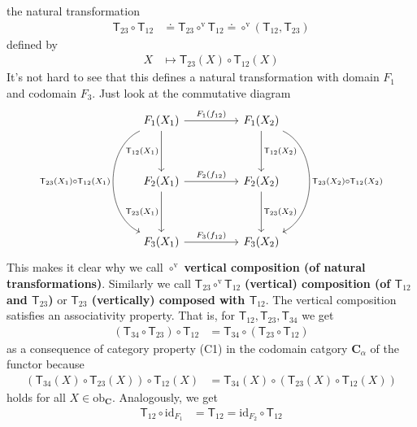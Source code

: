 the natural transformation
\begin{align*}
  \mathsf{T}_{23}
  \circ
  \mathsf{T}_{12}
  &\doteq
  \mathsf{T}_{23}
  \circ^{\textrm{v}}
  \mathsf{T}_{12}
  \doteq
  \circ^{\textrm{v}}(\mathsf{T}_{12},\mathsf{T}_{23})
\end{align*}
defined by
\begin{align*}
  X
  &\mapsto
  \mathsf{T}_{23}(X)
  \circ
  \mathsf{T}_{12}(X)
\end{align*}
It's not hard to see that this defines a natural transformation with domain $F_{1}$ and codomain $F_{3}$. Just look at the commutative diagram
\[
\begin{tikzcd}[sep=huge]
  F_{1}(X_{1})
  \arrow{r}{F_{1}(f_{12})}
  \arrow[swap]{d}{\mathsf{T}_{12}(X_{1})}
  \arrow[bend right=65,swap]{dd}{\mathsf{T}_{23}(X_{1}) \circ \mathsf{T}_{12}(X_{1})}
  &
  F_{1}(X_{2})
  \arrow{d}{\mathsf{T}_{12}(X_{2})}
  \arrow[bend left=65]{dd}{\mathsf{T}_{23}(X_{2}) \circ \mathsf{T}_{12}(X_{2})}
  \\
  F_{2}(X_{1})
  \arrow{r}{F_{2}(f_{12})}
  \arrow[swap]{d}{\mathsf{T}_{23}(X_{1})}
  &
  F_{2}(X_{2})
  \arrow{d}{\mathsf{T}_{23}(X_{2})}
  \\
  F_{3}(X_{1})
  \arrow{r}{F_{3}(f_{12})}
  &
  F_{3}(X_{2})
\end{tikzcd}
\]
This makes it clear why we call $\circ^{\textrm{v}}$ \textbf{vertical composition (of natural transformations)}. Similarly we call $\mathsf{T}_{23} \circ^{\textrm{v}} \mathsf{T}_{12}$ \textbf{(vertical) composition (of $\mathsf{T}_{12}$ and $\mathsf{T}_{23}$)} or \textbf{$\mathsf{T}_{23}$ (vertically) composed with $\mathsf{T}_{12}$}. The vertical composition satisfies an associativity property. That is, for $\mathsf{T}_{12},\mathsf{T}_{23},\mathsf{T}_{34}$ we get
\begin{align*}
  (\mathsf{T}_{34} \circ \mathsf{T}_{23})
  \circ
  \mathsf{T}_{12}
  &=
  \mathsf{T}_{34}
  \circ
  (\mathsf{T}_{23} \circ \mathsf{T}_{12})
\end{align*}
as a consequence of category property (C1) in the codomain catgory $\mathbf{C}_{\alpha}$ of the functor because
\begin{align*}
  (\mathsf{T}_{34}(X) \circ \mathsf{T}_{23}(X))
  \circ
  \mathsf{T}_{12}(X)
  &=
  \mathsf{T}_{34}(X)
  \circ
  (\mathsf{T}_{23}(X) \circ \mathsf{T}_{12}(X))
\end{align*}
holds for all $X \in \mathrm{ob}_{\mathbf{C}}$. Analogously, we get
\begin{align*}
  \mathsf{T}_{12}
  \circ
  \mathrm{id}_{F_{1}}
  &=
  \mathsf{T}_{12}
  =
  \mathrm{id}_{F_{2}}
  \circ
  \mathsf{T}_{12}
\end{align*}
